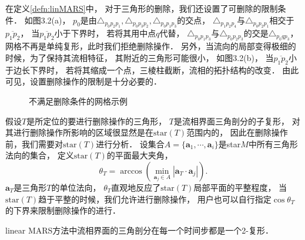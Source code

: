 在定义\ref{defn:linMARS}中，
对于三角形的删除，我们还设置了可删除的限制条件．
如图3.2(a)，
$p_0$是由$\triangle_{p_0 p_2 p_1}, \triangle_{p_0 p_3 p_2 }, \triangle_{p_0 p_1 p_3}$的交点，
$\triangle_{p_1 p_2 p_4}$与$\triangle_{p_0 p_2 p_1}$相交于$\overline{p_1 p_2}$，
当$\overline{p_1 p_2}$小于下界时，
若将其用中点$q$代替，
$\triangle_{p_0 p_1 p_3}$与$\triangle_{p_0 p_2 p_3}$的交是$\triangle_{p_0 q p_3}$，
网格不再是单纯复形，此时我们拒绝删除操作．
另外，当流向的局部变得极细的时候，为了保持其流相特征，
其附近的三角形可能很小，
如图3.2(b)，
当$\overline{p_1p_2}$小于边长下界时，
若将其缩成一个点，三棱柱截断，流相的拓扑结构的改变．
由此可见，设置删除操作的限制是十分必要的．

\begin{figure}[htb]
	\label{fig:noDelete}
	\centering
	\hfill
	\caption{不满足删除条件的网格示例}
\end{figure}

假设$T$是所定位的要进行删除操作的三角形，
$T$是流相界面三角剖分的子复形，
对其进行删除操作所影响的区域很显然是在$\mathrm{star}(T)$范围内的，
因此在删除操作前，我们需要对$\mathrm{star}(T)$进行分析．
设集合$A=\{\mathbf{a}_1,\cdots,\mathbf{a}_i\}$是star$M$中所有三角形法向的集合，
定义$\mathrm{star}(T)$的平面最大夹角，
\begin{equation}
\label{defn:maxTheta}
\theta_T=\arccos(\min_{\textbf{a}_j\in A}|\mathbf{a}_T\cdot\mathbf{a}_j |).
\end{equation}
$\mathbf{a}_T$是三角形$T$的单位法向，
$\theta_T$直观地反应了$\mathrm{star}(T)$局部平面的平整程度，
当$\mathrm{star}(T)$趋于平整的时候，我们允许进行删除操作，
用户也可以自行指定$\cos\theta_T$的下界来限制删除操作的进行．
\begin{prop}
	linear MARS方法中流相界面的三角剖分在每一个时间步都是一个2-复形．
\end{prop}

